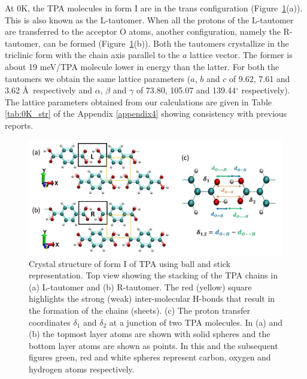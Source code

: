 At 0K, the TPA molecules in form I are in the trans configuration (Figure~\ref{fig:str_ptc}(a)). This is also known as the L-tautomer.
When all the protons of the L-tautomer are transferred to the acceptor O atoms,
another configuration, namely the R-tautomer, can be formed
(Figure~\ref{fig:str_ptc}(b)). Both the tautomers crystallize in the triclinic form with the chain axis parallel to the $a$ lattice vector.
The former is about 19 meV/TPA molecule lower in energy than the latter.
For both the tautomers we obtain the same lattice parameters
($a$, $b$ and $c$ of 9.62, 7.61 and 3.62 \AA~respectively and
$\alpha$, $\beta$ and $\gamma$ of 73.80, 105.07 and 139.44$^{\circ}$
respectively). The lattice parameters obtained from our calculations
are given in Table \ref{tab:0K_str} of the Appendix \ref{appendix4} showing consistency with previous reports\cite{bailey1967crystal,sledz2001new}.

\begin{figure}
    \centering
    \includegraphics[width=16cm ]{./Chapter1/new_figures/structure_ptc.jpg}
    \caption{Crystal structure of form I of TPA using ball and stick 
    representation. Top view showing the stacking of the TPA chains in
    (a) L-tautomer and (b) R-tautomer. The red (yellow) square highlights the strong (weak) inter-molecular H-bonds that result in the formation of the chains (sheets).
    (c) The proton transfer coordinates
    $\delta_1$ and $\delta_2$ at a junction of two TPA molecules. In (a)
    and (b) the topmost layer atoms are shown with solid spheres and the bottom 
    layer atoms are shown as points. In this and the subsequent figures green, red and white spheres represent carbon, oxygen and hydrogen atoms respectively.}
    \label{fig:str_ptc}
\end{figure}

